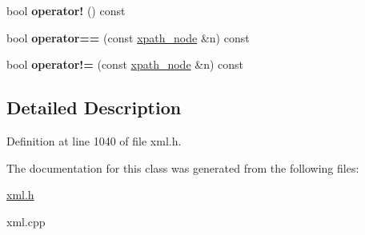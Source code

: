 \begin{DoxyCompactItemize}
\item 
\hypertarget{classphys_1_1xml_1_1xpath__node_adaf2965c9efbe1690a4b4feda88f153d}{
bool {\bfseries operator!} () const }
\label{d3/d5a/classphys_1_1xml_1_1xpath__node_adaf2965c9efbe1690a4b4feda88f153d}

\item 
\hypertarget{classphys_1_1xml_1_1xpath__node_aece2f21210be813f1acb58827e35ed78}{
bool {\bfseries operator==} (const \hyperlink{classphys_1_1xml_1_1xpath__node}{xpath\_\-node} \&n) const }
\label{d3/d5a/classphys_1_1xml_1_1xpath__node_aece2f21210be813f1acb58827e35ed78}

\item 
\hypertarget{classphys_1_1xml_1_1xpath__node_aee14528f0686476a8c34b5d780e53a4a}{
bool {\bfseries operator!=} (const \hyperlink{classphys_1_1xml_1_1xpath__node}{xpath\_\-node} \&n) const }
\label{d3/d5a/classphys_1_1xml_1_1xpath__node_aee14528f0686476a8c34b5d780e53a4a}

\end{DoxyCompactItemize}


\subsection{Detailed Description}


Definition at line 1040 of file xml.h.



The documentation for this class was generated from the following files:\begin{DoxyCompactItemize}
\item 
\hyperlink{xml_8h}{xml.h}\item 
xml.cpp\end{DoxyCompactItemize}
